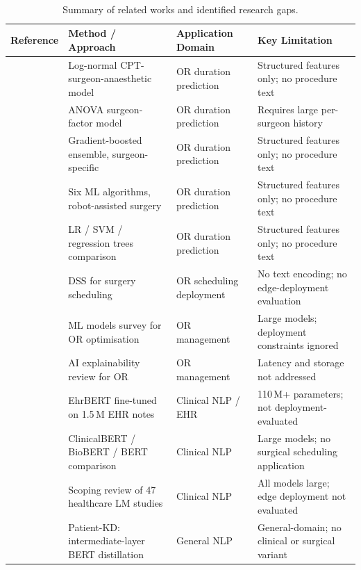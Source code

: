 \begin{table}[tp]
\centering
\caption{\\Summary of related works and identified research gaps.}
\label{tab:related_summary}
\begin{threeparttable}
\begin{tabularx}{\linewidth}{@{}lXlX@{}}
\toprule
Reference & Method / Approach & Application Domain & Key Limitation \\
\midrule
\cite{stepaniak2009modeling} & Log-normal CPT-surgeon-anaesthetic model & OR duration prediction & Structured features only; no procedure text \\
\cite{stepaniak2010modeling} & ANOVA surgeon-factor model & OR duration prediction & Requires large per-surgeon history \\
\cite{bartek2019improving}   & Gradient-boosted ensemble, surgeon-specific & OR duration prediction & Structured features only; no procedure text \\
\cite{zhao2019machine}       & Six ML algorithms, robot-assisted surgery & OR duration prediction & Structured features only; no procedure text \\
\cite{martinez2021machine}   & LR / SVM / regression trees comparison & OR duration prediction & Structured features only; no procedure text \\
\cite{dios2015decision}      & DSS for surgery scheduling & OR scheduling deployment & No text encoding; no edge-deployment evaluation \\
\cite{bellini2020artificial} & ML models survey for OR optimisation & OR management & Large models; deployment constraints ignored \\
\cite{bellini2024artificial} & AI explainability review for OR & OR management & Latency and storage not addressed \\
\cite{li2019fine}            & EhrBERT fine-tuned on 1.5\,M EHR notes & Clinical NLP / EHR & 110\,M+ parameters; not deployment-evaluated \\
\cite{turchin2023comparison} & ClinicalBERT / BioBERT / BERT comparison & Clinical NLP & Large models; no surgical scheduling application \\
\cite{nunes2024health}       & Scoping review of 47 healthcare LM studies & Clinical NLP & All models large; edge deployment not evaluated \\
\cite{sun2019patient}        & Patient-KD: intermediate-layer BERT distillation & General NLP & General-domain; no clinical or surgical variant \\

\end{tabularx}
\end{threeparttable}
\end{table}
